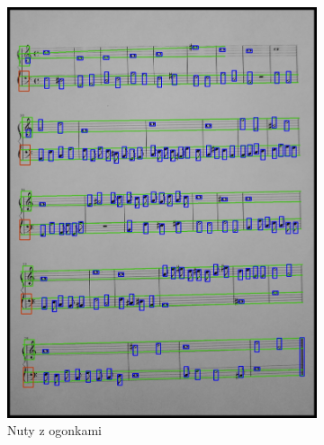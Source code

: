 \documentclass[12pt]{article}
\begin{document}
\begin{figure}[h!]
\begin{subfigure}[b]{0.32\linewidth}
				\includegraphics[width=\linewidth]{zdj/step_3.jpg}
				\caption{Nuty z ogonkami}
			\end{subfigure}
			\begin{subfigure}[b]{0.32\linewidth}

\end{subfigure}
\end{figure}
\end{document}

